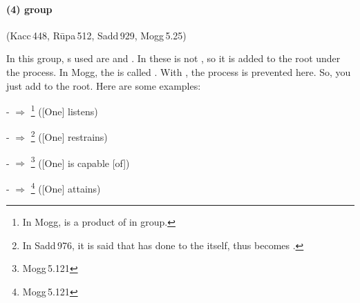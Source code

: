 \paragraph*{(4)  group} (Kacc\,448, R\=upa\,512, Sadd\,929, Mogg\,5.25)\label{pacca:dnu}\label{pacca:dnaa}\label{pacca:udnaa}\label{pacca:kdno}\par
In this group, s used are  and . In these  is not , so it is added to the root under the process. In Mogg, the  is called . With , the  process is prevented here. So, you just add  to the root. Here are some examples:\par
-  $\Rightarrow$ \footnote{In Mogg,  is a product of  in  group.} ([One] listens)\par
-  $\Rightarrow$ \footnote{In Sadd\,976, it is said that  has  done to the  itself, thus  becomes .} ([One] restrains)\par
-  $\Rightarrow$ \footnote{Mogg\,5.121} ([One] is capable [of])\par
-  $\Rightarrow$ \footnote{Mogg\,5.121} ([One] attains)\par


